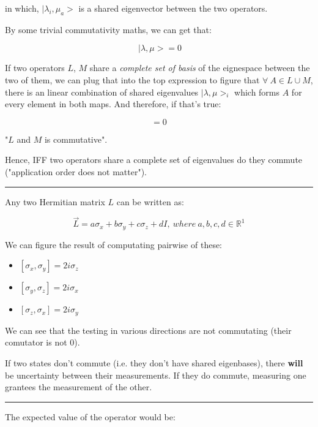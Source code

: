 \documentclass[letterpaper]{article}
\begin{document}
in which, \(|\lambda_i,\mu_a\big>\) is a shared eigenvector between the two operators.

By some trivial commutativity maths, we can get that:

\begin{equation}
   [L, M]\ | \lambda, \mu \big> = 0
\end{equation}

If two operators \(L\), \(M\) share a \emph{complete set of basis} of the eignespace between the two of them, we can plug that into the top expression to figure that \(\forall\ A \in L \cup M\), there is an linear combination of shared eigenvalues \(|\lambda, \mu\big>_i\) which forms \(A\) for every element in both maps. And therefore, if that's true:

\begin{equation}
   [L,M] = 0 
\end{equation}

"\(L\) and \(M\) is commutative".

Hence, IFF two operators share a complete set of eigenvalues do they commute ("application order does not matter").

\noindent\rule{\textwidth}{0.5pt}

Any two Hermitian matrix \(L\) can be written as:

\begin{equation}
   \vec{L} = a \sigma_x  + b \sigma_y+ c \sigma_z+ d I,\ where\ a,b,c,d\in \mathbb{R}^1
\end{equation}

We can figure the result of computating pairwise of these:

\begin{itemize}
\item \([\sigma_x, \sigma_y] = 2i\sigma_z\)
\item \([\sigma_y, \sigma_z] = 2i\sigma_x\)
\item \([\sigma_z, \sigma_x] = 2i\sigma_y\)
\end{itemize}

We can see that the testing in various directions are not commutating (their comutator is not 0).

If two states don't commute (i.e. they don't have shared eigenbases), there \textbf{will} be uncertainty between their measurements. If they do commute, measuring one grantees the measurement of the other.

\noindent\rule{\textwidth}{0.5pt}

The expected value of the operator would be:
\end{document}
